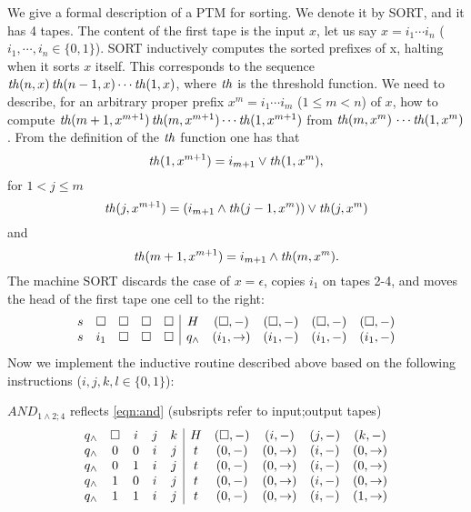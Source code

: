 \documentclass{lmcs}
\begin{document}
We give a formal description of a PTM for sorting. 
We denote it by SORT, and it has 4 tapes. The content of the first tape is the input $x$, let us say  $x=i_1 \cdots i_n$ ($i_1 ,\cdots ,i_n \in\{ 0,1\}$). SORT inductively computes the sorted prefixes of x, halting when it sorts $x$ itself. This corresponds to the sequence $\mathit{th}(n,x)\, \mathit{th}(n-1,x) \cdots \mathit{th}(1,x)$, where $\mathit{th}$ is the threshold function. 
We need to describe, for an arbitrary proper prefix $x^m =i_1 \cdots i_m$ ($1\leq m< n$) of $x$, how to compute $\mathit{th}(m+1,x^{m+1})\, \mathit{th}(m,x^{m+1}) \cdots \mathit{th}(1,x^{m+1})$ from $\mathit{th}(m,x^{m})\, \cdots \mathit{th}(1,x^{m})$. From the definition of the $\mathit{th}$ function one has that 
\begin{equation}
\label{eqn:or}
\mathit{th}(1, x^{m+1} )= i_{m+1} \vee \mathit{th}(1,x^m ),
\end{equation}
for $1<j\leq m$ 
\begin{equation}
\label{eqn:andor}
\mathit{th}(j, x^{m+1} )= ( i_{m+1} \wedge \mathit{th}(j-1,x^m ))\vee \mathit{th}(j,x^m)
\end{equation}
and 
\begin{equation}
\label{eqn:and}
\mathit{th}(m+1, x^{m+1})=  i_{m+1} \wedge \mathit{th}(m, x^m ).
\end{equation}
The machine SORT discards the case of $x=\epsilon$, copies $i_1$ on tapes 2-4, and moves the head of the first tape one cell to the right: 
$$
\begin{array}{ccccc|ccccc}
s & \square & \square & \square & \square & H  & (\square , -) & (\square ,-) & (\square ,-) & (\square ,-)\\
s & i_1 & \square & \square & \square & q_\wedge & (i_1 ,\rightarrow) & (i_1 ,-) &  (i_1 ,-) &  (i_1 ,-)
\end{array}
$$
Now we implement the inductive routine described above based on the following instructions ($i,j,k,l\in\{ 0,1\}$): 

$AND_{1\wedge 2;4}$ reflects \eqref{eqn:and} (subsripts refer to input;output tapes)
$$
\begin{array}{ccccc|ccccc}
q_\wedge & \square & i & j & k & H  & (\square ,-) & (i,-) & (j,-) & (k,- )\\
q_\wedge & 0 & 0 & i & j & t  & (0,-) & (0,\rightarrow) & (i,-) & (0,\rightarrow )\\
q_\wedge & 0 & 1 & i & j & t  & (0,-) & (0,\rightarrow) & (i,-) & (0,\rightarrow )\\
q_\wedge & 1 & 0 & i & j & t  & (0,-) & (0,\rightarrow) & (i,-) & (0,\rightarrow )\\
q_\wedge & 1 & 1 & i & j & t  & (0,-) & (0,\rightarrow) & (i,-) & (1,\rightarrow )\\
\end{array}
$$
\end{document}
